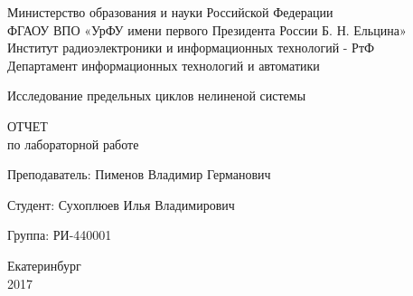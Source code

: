 \begin{center}
  Министерство образования и науки Российской Федерации\\
  ФГАОУ ВПО  «УрФУ имени первого Президента России Б. Н. Ельцина»\\
  Институт радиоэлектроники и информационных технологий - РтФ\\
  Департамент информационных технологий и автоматики
  \par
  \vspace{4.5cm}
  \Large{
    Исследование предельных циклов нелиненой системы
    
    \par
    \vspace{0.5cm}

    ОТЧЕТ\\
    по лабораторной работе
  }

  \vspace{4cm}
  {
    Преподаватель: \hfill Пименов Владимир Германович
  }
  \par
  {
    Студент: \hfill Сухоплюев Илья Владимирович
  }
  \par
  {
    Группа: \hfill РИ-440001
  }

  \par
  \vspace{3.5cm}
  Екатеринбург\\
  2017
\end{center}
  